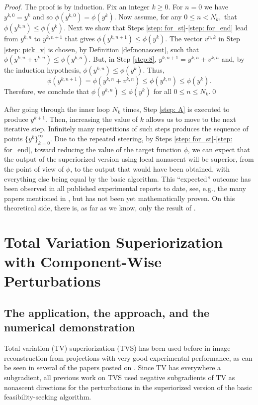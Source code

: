 \documentclass[smallextended]{svjour3}      %
\begin{document}
\begin{proof}
	The proof is by induction. Fix an integer $k\geq0.$ For $n=0$ we have $y^{k,0}=y^{k}$ and so $\phi(y^{k,0})=\phi(y^{k})$. Now assume, for any $0\leq n<N_{k},$ that $\phi(y^{k,n})\leq\phi(y^{k}).$ Next	we show that Steps \ref{step: for_st}-\ref{step: for_end} lead from $y^{k,n}$ to $y^{k,n+1}$ that gives $\phi(y^{k,n+1})\leq\phi(y^{k})$. The vector $v^{n,k}$ in Step \ref{step: pick_v} is chosen, by Definition \ref{def:nonascent}, such that $\phi(y^{k,n}+v^{k,n})\leq\phi(y^{k,n})$. But, in Step \ref{step:8}, $y^{k,n+1}=y^{k,n}+v^{k,n}$ and, by the induction hypothesis, $\phi(y^{k,n})\leq\phi(y^{k})$. Thus,	
	\begin{equation}
	\phi(y^{k,n+1})=\phi(y^{k,n}+v^{k,n})\leq\phi(y^{k,n})\leq\phi(y^{k}).
	\end{equation}
	Therefore, we conclude that $\phi\left(y^{k,n}\right)\leq\phi\left(y^{k}\right)$
	for all $0\leq n\leq N_{k}$.\qed
\end{proof}
After going through the inner loop $N_{k}$ times, Step \ref{step: A} is executed to produce $y^{k+1}$. Then, increasing the value of $k$ allows us to move to the next iterative step. Infinitely many repetitions of such steps produces the sequence of points $\{y^{k}\}_{k=0}^{\infty}$. Due to the repeated steering, by Steps \ref{step: for_st}-\ref{step: for_end}, toward reducing the value of the target function $\phi$, we can expect that the output of the superiorized version using local nonascent will be superior, from the point of view of $\phi$, to the output that would have been obtained, with everything else being equal by the basic algorithm. This ``expected'' outcome has been observed in all published experimental reports to date, see, e.g., the many papers mentioned in \cite{sup-bib}, but has not been yet mathematically proven. On this theoretical side, there is, as far as we know, only the result of \cite{strictfejer}.


\section{Total Variation Superiorization with Component-Wise Perturbations\label{sec:CD for TVS-1}}

\subsection{The application, the approach, and the numerical demonstration}

Total variation (TV) superiorization (TVS) has been used before in image reconstruction from projections with very good experimental performance, as can be seen in several of the papers posted on \cite{sup-bib}. Since TV has everywhere a subgradient, all previous work on TVS used negative subgradients of TV as nonascent directions for the perturbations in the superiorized version of the basic feasibility-seeking algorithm.
\end{document}
